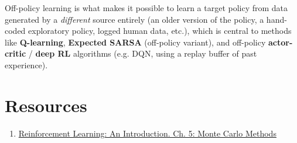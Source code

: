 \documentclass[11pt]{article}
\begin{document}
Off-policy learning is what makes it possible to learn a target policy from data generated by a \emph{different} source entirely (an older version of the policy, a hand-coded exploratory policy, logged human data, etc.), which is central to methods like \textbf{Q-learning}, \textbf{Expected SARSA} (off-policy variant), and off-policy \textbf{actor-critic} / \textbf{deep RL} algorithms (e.g. DQN, using a replay buffer of past experience).

\section*{Resources}

\begin{enumerate}
    \item[{[1]}] \href{https://web.stanford.edu/class/psych209/Readings/SuttonBartoIPRLBook2ndEd.pdf}{Reinforcement Learning: An Introduction. Ch. 5: Monte Carlo Methods}
\end{enumerate}
\end{document}
